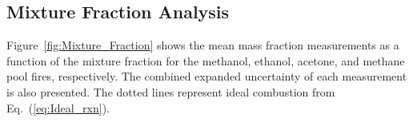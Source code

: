 \documentclass[preprint,review,12pt]{elsarticle}
\begin{document}
\subsection{Mixture Fraction Analysis}
\label{ssec:Mixture_Faction_Analysis}
Figure~\ref{fig:Mixture_Fraction} shows the mean mass fraction measurements as a function of the mixture fraction for the methanol, ethanol, acetone, and methane pool fires, respectively. The combined expanded uncertainty of each measurement is also presented. The dotted lines represent ideal combustion from Eq.~(\ref{eq:Ideal_rxn}).
\end{document}
